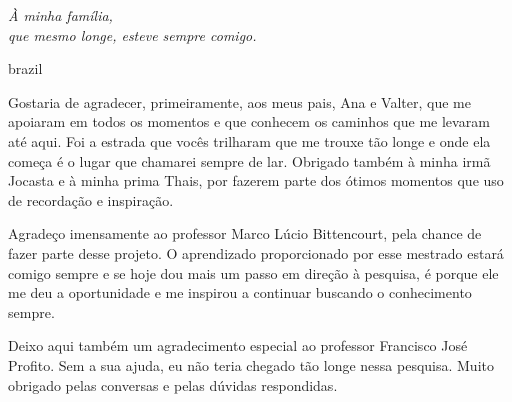 

\begin{dedicatoria}
    \vspace*{\fill}
    \centering
    \noindent
    \textit{À minha família,\\
    	    que mesmo longe, esteve sempre comigo. }
    \vspace*{\fill}
\end{dedicatoria}

\begin{otherlanguage*}{brazil}
\begin{agradecimentos}

Gostaria de agradecer, primeiramente, aos meus pais, Ana e Valter, que me apoiaram em todos os momentos e que conhecem os caminhos que me levaram até aqui. Foi a estrada que vocês trilharam que me trouxe tão longe e onde ela começa é o lugar que chamarei sempre de lar. Obrigado também à minha irmã Jocasta e à minha prima Thais, por fazerem parte dos ótimos momentos que uso de recordação e inspiração. 

Agradeço imensamente ao professor Marco Lúcio Bittencourt, pela chance de fazer parte desse projeto. O aprendizado proporcionado por esse mestrado estará comigo sempre e se hoje dou mais um passo em direção à pesquisa, é porque ele me deu a oportunidade e me inspirou a continuar buscando o conhecimento sempre.

Deixo aqui também um agradecimento especial ao professor Francisco José Profito. Sem a sua ajuda, eu não teria chegado tão longe nessa pesquisa. Muito obrigado pelas conversas e pelas dúvidas respondidas.  

  




\end{agradecimentos}
\end{otherlanguage*}



